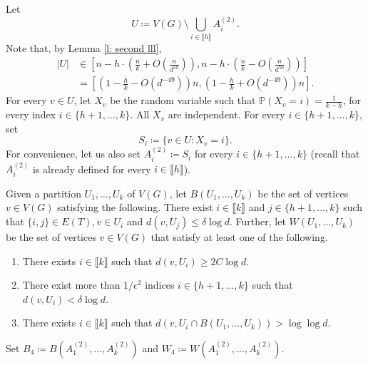 \documentclass[notitlepage]{scrartcl}
\newcommand{\br}[1]{\llbracket{#1}\rrbracket}
\begin{document}
Let 
\begin{equation}
    U\coloneqq V(G)\setminus \bigcup_{i \in \br{h}} A_i^{(2)}.
    \label{eq:U-def}
\end{equation}
    Note that, by Lemma \ref{l: second lll},
\begin{align}
  |U|&\in \left[n-h\cdot\left(\frac{n}{k}+O\left(\frac{n}{d^{50}}\right)\right), n-h\cdot\left(\frac{n}{k}-O\left(\frac{n}{d^{50}}\right)\right)\right]\nonumber\\
  &=\left[\left(1-\frac{h}{k}-O(d^{-49})\right)n, \left(1-\frac{h}{k}+O(d^{-49})\right)n\right]. \label{eq: size y}
\end{align}
For every $v \in U$, let $X_v$ be the random variable such that $\mathbb{P}\left(X_v=i\right)=\frac{1}{k-h}$, for every index $i\in\{h+1,\ldots,k\}$. All $X_v$ are independent. For every $i\in\{h+1,\ldots,k\}$, set 
\[
    S_i \coloneqq \{v \in U \colon X_v = i\}.
\]
For convenience, let us also set $A_i^{(2)}\coloneqq S_i$ for every $i\in \{h+1,\ldots,k\}$ (recall that $A_i^{(2)}$ is already defined for every $i\in \br{h}$).


Given a partition $U_1,\ldots, U_k$ of $V(G)$, let $B(U_1,\ldots, U_k)$ be the set of vertices $v\in V(G)$ satisfying the following. There exist $i\in \br{k}$ and $j\in \{h+1,\ldots, k\}$ such that $\{i,j\}\in E(T), v\in U_i$ and $d(v,U_j)\le \delta \log d$. Further, let $W(U_1,\ldots, U_k)$ be the set of vertices $v\in V(G)$ that satisfy at least one of the following.
\begin{enumerate}
    \item There exists $i \in \br{k}$ such that $d(v, U_i )\ge 2C \log d$.
    \item There exist more than $1 / \epsilon^2$ indices $i \in \{h+1,\ldots,k\}$ such that $d(v, U_i) < \delta \log d$.
    \item There exists $i \in \br{k}$ such that $d\left(v, U_i \cap B(U_1,\ldots,U_k)\right) > \log \log d$.    
\end{enumerate}
Set $B_4\coloneqq B(A_1^{(2)},\ldots, A_k^{(2)})$ and $W_4\coloneqq W(A_1^{(2)},\ldots, A_k^{(2)})$.
\end{document}
